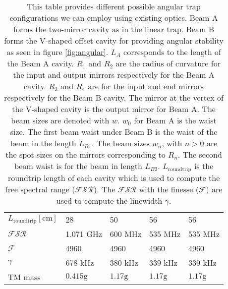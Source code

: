 \begin{table}
\begin{center}
\begin{tabular}{|l|l|l|l|l|}
$L_\mathrm{roundtrip}[\mathrm{cm}]$ & 28& 50        & 56     & 56 \\
$\mathcal{FSR}$ & 1.071 GHz  & 600 MHz     & 535 MHz  & 535 MHz \\
$\mathcal{F}$ & 4960         & 4960        & 4960     & 4960 \\
$\gamma$ & 678 kHz           & 380 kHz     & 339 kHz  & 339 kHz \\
\hline
TM mass  & $0.415\mathrm{g}$ & $1.17\mathrm{g}$ & $1.17\mathrm{g}$ & $1.17\mathrm{g}$ \\
\hline
\end{tabular}
\end{center}
\caption[Angular Trap Parameters']{This table provides different possible
    angular trap configurations we can employ using existing optics.
    Beam A forms the two-mirror cavity as in the linear trap.
    Beam B forms the V-shaped offset cavity for providing angular stability
    as seen in figure \ref{fig:angular}.
    $L_A$ corresponds to the length of the Beam A cavity.
    $R_1$ and $R_2$ are the radius of curvature for the input and output mirrors
    respectively for the Beam A cavity.
    $R_3$ and $R_4$ are for the input and end mirrors respectively for the Beam B
    cavity.
    The mirror at the vertex of the V-shaped cavity is the output mirror for
    Beam A.
    The beam sizes are denoted with $w$. $w_0$ for Beam A is the waist size.
    The first beam waist under Beam B is the waist of the beam
    in the length $L_{B1}$.
    The beam sizes $w_n$, with $n>0$ are the spot sizes on the mirrors
    corresponding to $R_n$.
    The second beam waist is for the beam in length $L_{B2}$.
    $L_\mathrm{roundtrip}$ is the roundtrip length of each cavity which is used
    to compute the free spectral range ($\mathcal{FSR}$).
    The $\mathcal{FSR}$ with the finesse ($\mathcal{F}$) are used to compute the
    linewidth $\gamma$.
    }
\label{tab:angleparams}
\end{table}



